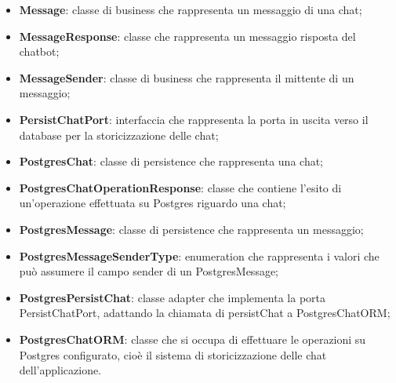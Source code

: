 \documentclass[10pt, a4paper]{article}
\begin{document}
\begin{itemize}
    \item \label{Message}\textbf{Message}: classe di business che rappresenta un messaggio di una chat;
    \item \label{MessageResponse}\textbf{MessageResponse}: classe che rappresenta un messaggio risposta del chatbot;
    \item \label{MessageSender}\textbf{MessageSender}: classe di business che rappresenta il mittente di un messaggio;
    

    \item \label{PersistChatPort}\textbf{PersistChatPort}: interfaccia che rappresenta la porta in uscita verso il database per la storicizzazione delle chat;
    \item \label{PostgresChat}\textbf{PostgresChat}: classe di persistence che rappresenta una chat;
    \item \label{PostgresChatOperationResponse}\textbf{PostgresChatOperationResponse}: classe che contiene l'esito di un'operazione effettuata su Postgres riguardo una chat;
    \item \label{PostgresMessage}\textbf{PostgresMessage}: classe di persistence che rappresenta un messaggio;
    \item \label{PostgresMessageSenderType}\textbf{PostgresMessageSenderType}: enumeration che rappresenta i valori che può assumere il campo sender di un PostgresMessage;
    \item \label{PostgresPersistChat}\textbf{PostgresPersistChat}: classe adapter che implementa la porta PersistChatPort, adattando la chiamata di persistChat a PostgresChatORM;
    \item \label{PostgresChatORM}\textbf{PostgresChatORM}: classe che si occupa di effettuare le operazioni su Postgres configurato, cioè il sistema di storicizzazione delle chat dell'applicazione.
    
\end{itemize}
\end{document}
